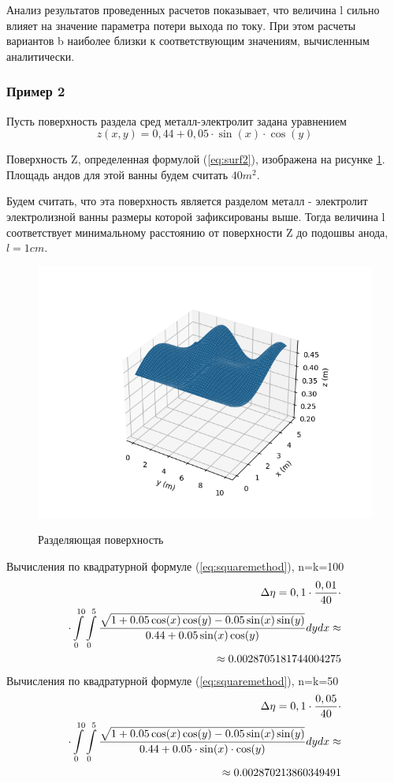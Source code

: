 \documentclass{article}
\begin{document}
Анализ результатов проведенных расчетов показывает, что величина l сильно влияет на значение параметра потери выхода по току. При этом расчеты вариантов b наиболее близки к соответствующим значениям, вычисленным аналитически. 

\subsubsection*{Пример 2}\label{ex2m}
Пусть поверхность раздела сред металл-электролит задана уравнением
\begin{equation}\label{eq:surf2}
z(x,y)=0,44+0,05 \cdot \sin(x) \cdot \cos(y)
\end{equation}

Поверхность Z, определенная формулой (\ref{eq:surf2}), изображена на рисунке \ref{fig:H2Surf}. Площадь андов для этой ванны будем считать $40 m^2$.

Будем считать, что эта поверхность является разделом металл - электролит электролизной ванны размеры которой зафиксированы выше. Тогда величина l соответствует минимальному расстоянию от поверхности Z до подошвы анода, $l=1 cm$.

\begin{figure}[H]
\centering
\includegraphics[width=0.8\linewidth]{Second_surface.png}
\caption{}
\label{fig:H2Surf}
Разделяющая поверхность
\end{figure}


Вычисления по квадратурной формуле (\ref{eq:squaremethod}), n=k=100
\begin{align}\label{eq:sq2min10}
\Delta \eta = 0,1 \cdot \frac{0,01}{40} \cdot \notag \\
\cdot \int\limits_0^{10} \int\limits_0^5 \frac{\sqrt{1+0.05 \cos(x)\cos(y)-0.05 \sin(x)\sin(y)}}{0.44 + 0.05 \sin(x)\cos(y)} dy dx \approx \notag \\ \approx 0.0028705181744004275
\end{align}
Вычисления по квадратурной формуле (\ref{eq:squaremethod}), n=k=50
\begin{align}\label{eq:sq2min5}
\Delta \eta = 0,1 \cdot \frac{0,05}{40}  \cdot \notag \\
\cdot \int\limits_0^{10} \int\limits_0^5 \frac{\sqrt{1+0.05 \cos(x)\cos(y)-0.05 \sin(x)\sin(y)}}{0.44 + 0.05 \cdot \sin(x) \cdot \cos(y)} dy dx \approx \notag \\ \approx 0.002870213860349491
\end{align}
\end{document}

